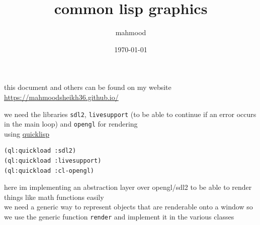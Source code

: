 \documentclass[a4paper,12pt]{article}
\author{mahmood}
\date{\today}
\title{common lisp graphics}
\begin{document}
\maketitle
\begin{note}
this document and others can be found on my website\\
\url{https://mahmoodsheikh36.github.io/}
\end{note}
we need the libraries \texttt{sdl2}, \texttt{livesupport} (to be able to continue if an error occurs in the main loop) and \texttt{opengl} for rendering\\
using \href{20230224163920-common_lisp.org}{quicklisp}\\
\lstset{language=Lisp,label= ,caption= ,captionpos=b,numbers=none}
\begin{lstlisting}
(ql:quickload :sdl2)
(ql:quickload :livesupport)
(ql:quickload :cl-opengl)
\end{lstlisting}
here im implementing an abstraction layer over opengl/sdl2 to be able to render things like math functions easily\\
we need a generic way to represent objects that are renderable onto a window so we use the generic function \texttt{render} and implement it in the various classes\\
\lstset{language=Lisp,label= ,caption= ,captionpos=b,numbers=none}
\end{document}
